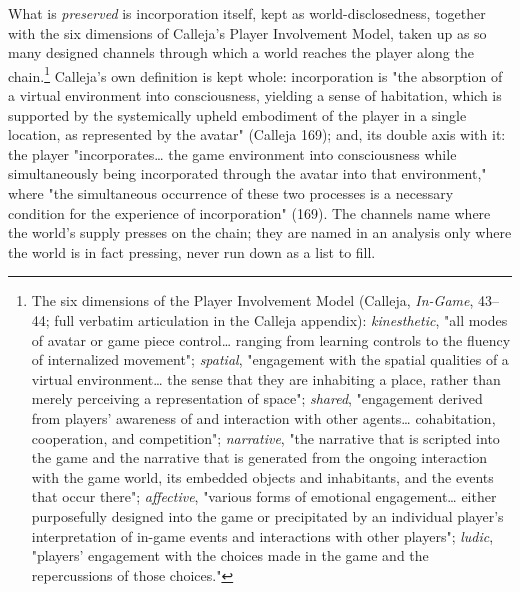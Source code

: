 \documentclass{article}
\begin{document}
What is \textit{preserved} is incorporation itself, kept as world-disclosedness, together with the six dimensions of Calleja's Player Involvement Model, taken up as so many designed channels through which a world reaches the player along the chain.\footnote{The six dimensions of the Player Involvement Model (Calleja, \textit{In-Game}, 43–44; full verbatim articulation in the Calleja appendix): \textit{kinesthetic}, "all modes of avatar or game piece control… ranging from learning controls to the fluency of internalized movement"; \textit{spatial}, "engagement with the spatial qualities of a virtual environment… the sense that they are inhabiting a place, rather than merely perceiving a representation of space"; \textit{shared}, "engagement derived from players' awareness of and interaction with other agents… cohabitation, cooperation, and competition"; \textit{narrative}, "the narrative that is scripted into the game and the narrative that is generated from the ongoing interaction with the game world, its embedded objects and inhabitants, and the events that occur there"; \textit{affective}, "various forms of emotional engagement… either purposefully designed into the game or precipitated by an individual player's interpretation of in-game events and interactions with other players"; \textit{ludic}, "players' engagement with the choices made in the game and the repercussions of those choices."} Calleja's own definition is kept whole: incorporation is "the absorption of a virtual environment into consciousness, yielding a sense of habitation, which is supported by the systemically upheld embodiment of the player in a single location, as represented by the avatar" (Calleja 169); and, its double axis with it: the player "incorporates… the game environment into consciousness while simultaneously being incorporated through the avatar into that environment," where "the simultaneous occurrence of these two processes is a necessary condition for the experience of incorporation" (169). The channels name where the world's supply presses on the chain; they are named in an analysis only where the world is in fact pressing, never run down as a list to fill.
\end{document}
